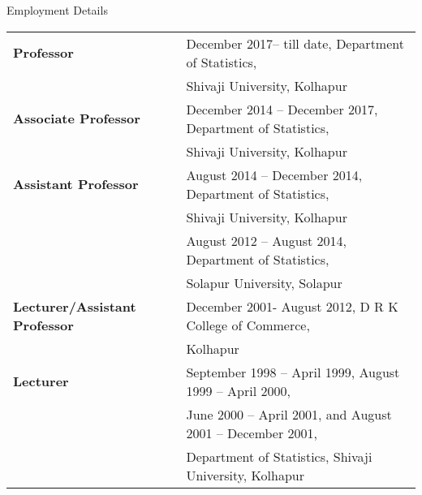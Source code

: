 \begin{rubric}{\color{Maroon}Employment Details}
\entry*[]%
\begin{tabular}{ll}
\hspace{-0.45cm}\textbf{Professor}                    & \hspace{-0.45cm}December 2017– till date, Department of Statistics,      \\
		&\hspace{-0.5cm} \vspace{0.3cm} Shivaji University, Kolhapur                             \\ 
\hspace{-0.45cm}\textbf{Associate Professor}          & \hspace{-0.45cm}December 2014 – December 2017, Department of Statistics, \\
		&\hspace{-0.5cm} \vspace{0.3cm} Shivaji University, Kolhapur                             \\
\hspace{-0.45cm}\textbf{Assistant Professor}          & \hspace{-0.45cm}August 2014 – December 2014, Department of Statistics,   \\
		&\hspace{-0.5cm} Shivaji University, Kolhapur                             \\
		& \hspace{-0.45cm}August 2012 – August 2014, Department of Statistics,     \\
		& \hspace{-0.5cm} \vspace{0.3cm} Solapur University, Solapur                              \\
\hspace{-0.45cm}\textbf{Lecturer/Assistant Professor} & \hspace{-0.45cm}December 2001- August 2012, D R K College of Commerce,   \\
		&\hspace{-0.5cm} \vspace{0.3cm}  Kolhapur                                                 \\
\hspace{-0.45cm}\textbf{Lecturer}                     & \hspace{-0.45cm}September 1998 – April 1999, August 1999 – April 2000,   \\
		&\hspace{-0.5cm} June 2000 – April 2001, and August 2001 – December 2001, \\
		&\hspace{-0.5cm} Department of Statistics, Shivaji University, Kolhapur  
	\end{tabular}
\end{rubric}